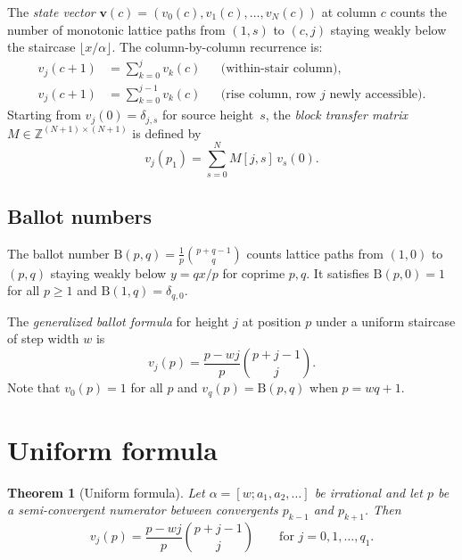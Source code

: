 \documentclass[11pt]{article}
\newtheorem{theorem}{Theorem}[section]
\theoremstyle{definition}
\theoremstyle{remark}
\newcommand{\floor}[1]{\lfloor #1 \rfloor}
\newcommand{\B}{\mathrm{B}}
\newcommand{\Z}{\mathbb{Z}}
\begin{document}
The \emph{state vector} $\mathbf{v}(c) = (v_0(c), v_1(c), \ldots,
v_N(c))$ at column $c$ counts the number of monotonic lattice paths
from $(1, s)$ to $(c, j)$ staying weakly below the staircase
$\floor{x/\alpha}$.
The column-by-column recurrence is:
\begin{align}
  v_j(c{+}1) &= \sum_{k=0}^{j} v_k(c)
  &&\text{(within-stair column)}, \label{eq:within}\\
  v_j(c{+}1) &= \sum_{k=0}^{j-1} v_k(c)
  &&\text{(rise column, row $j$ newly accessible)}.
  \label{eq:rise}
\end{align}
Starting from $v_j(0) = \delta_{j,s}$ for source height~$s$, the
\emph{block transfer matrix} $M \in \Z^{(N+1) \times (N+1)}$ is
defined by
\begin{equation}
  v_j(p_1) = \sum_{s=0}^{N} M[j, s]\, v_s(0).
\end{equation}

\subsection{Ballot numbers}

The ballot number $\B(p,q) = \frac{1}{p}\binom{p+q-1}{q}$ counts
lattice paths from $(1,0)$ to $(p,q)$ staying weakly below
$y = qx/p$ for coprime $p, q$.
It satisfies $\B(p, 0) = 1$ for all $p \geq 1$ and
$\B(1, q) = \delta_{q,0}$.

The \emph{generalized ballot formula} for height $j$ at position $p$
under a uniform staircase of step width $w$ is
\begin{equation}\label{eq:vlin}
  v_j(p) = \frac{p - wj}{p}\binom{p + j - 1}{j}.
\end{equation}
Note that $v_0(p) = 1$ for all $p$ and
$v_q(p) = \B(p, q)$ when $p = wq + 1$.

\section{Uniform formula}\label{sec:uniform}

\begin{theorem}[Uniform formula]\label{thm:uniform}
Let $\alpha = [w; a_1, a_2, \ldots]$ be irrational and let $p$
be a semi-convergent numerator between convergents $p_{k-1}$ and
$p_{k+1}$.
Then
\begin{equation}\label{eq:uniform}
  v_j(p) = \frac{p - wj}{p}\binom{p+j-1}{j}
  \qquad\text{for } j = 0, 1, \ldots, q_1.
\end{equation}
\end{theorem}
\end{document}
